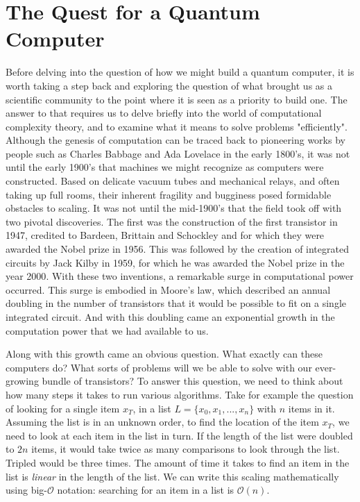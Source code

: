 \chapter{The Quest for a Quantum Computer}
Before delving into the question of how we might build a quantum computer, it is worth taking a step
back and exploring the question of what brought us as a scientific community to the point where
it is seen as a priority to build one. The answer to that requires us to delve briefly into
the world of computational complexity theory, and to examine what it means to solve problems "efficiently".
Although the genesis of computation can be traced back to pioneering works by people such as Charles Babbage
and Ada Lovelace in the early 1800's\cite{Bowden:1953:FTS:1102044}, it was not until the early 1900's that
machines we might recognize as computers were constructed. Based on delicate vacuum tubes and mechanical relays,
and often taking up full rooms, their inherent fragility and bugginess posed formidable obstacles to scaling.
It was not until the mid-1900's that the field took off with two pivotal discoveries. The first
was the construction of the first transistor in 1947, credited to Bardeen, Brittain and Schockley and for which
they were awarded the Nobel prize in 1956\cite{nobel1956}. This was followed by the creation of integrated circuits by Jack Kilby
in 1959, for which he was awarded the Nobel prize in the year 2000\cite{nobel2000}. With these two inventions, a remarkable
surge in computational power occurred. This surge is embodied in Moore's law, which described an annual
doubling in the number of transistors that it would be possible to fit on a single integrated circuit\cite{4785860}.
And with this doubling came an exponential growth in the computation power that we had available to us.

Along with this growth came an obvious question. What exactly can these computers do? What sorts of
problems will we be able to solve with our ever-growing bundle of transistors? To answer this question, we need to
think about how many steps it takes to run various algorithms. Take for example the question of looking
for a single item $x_T$, in a list $L = \{x_0, x_1, ..., x_n\}$ with $n$ items in it. Assuming the list
is in an unknown order, to find the location of the item $x_T$, we need to look at each item in the list
in turn. If the length of the list were doubled to $2n$ items, it would take twice as many comparisons to
look through the list. Tripled would be three times. The amount of time it takes to find an item in the
list is \emph{linear} in the length of the list. We can write this scaling mathematically using big-$\mathcal{O}$
notation: searching for an item in a list is $\mathcal{O}(n)$.


